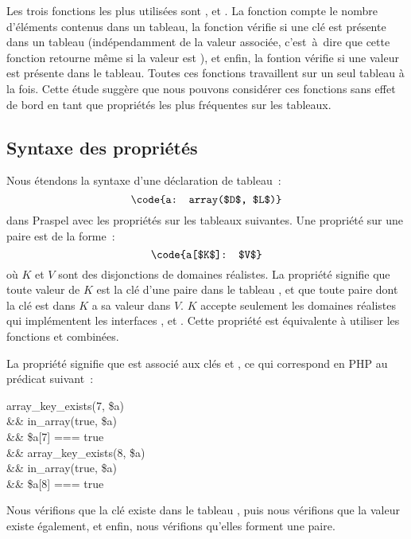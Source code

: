 %
Les trois fonctions les plus utilisées sont ,
 et . La fonction 
compte le nombre d'éléments contenus dans un tableau, la fonction
 vérifie si une clé est présente dans un tableau
(indépendamment de la valeur associée, c'est~à~dire que cette fonction retourne
 même si la valeur est ), et enfin, la fontion
 vérifie si une valeur est présente dans le tableau. Toutes
ces fonctions travaillent sur un seul tableau à la fois. Cette étude suggère que
nous pouvons considérer ces fonctions sans effet de bord en tant que propriétés
les plus fréquentes sur les tableaux.

\subsection{Syntaxe des propriétés}
\label{subsection:data:array_properties}

Nous étendons la syntaxe d'une déclaration de tableau~:
%
$$\code{a: array($D$, $L$)}$$
%
dans Praspel avec les propriétés sur les tableaux suivantes. Une propriété sur
une paire est de la forme~:
%
$$\code{a[$K$]: $V$}$$
%
où $K$ et $V$ sont des disjonctions de domaines réalistes. La propriété signifie
que toute valeur de $K$ est la clé d'une paire dans le tableau , et que
toute paire dont la clé est dans $K$ a sa valeur dans $V$. $K$ accepte
seulement les domaines réalistes qui implémentent les interfaces
,  et . Cette propriété est
équivalente à utiliser les fonctions  et
 combinées.

\begin{example}

La propriété  signifie que  est associé aux clés
 et , ce qui correspond en PHP au prédicat suivant~:
%
\begin{pre}
   array\_key\_exists(7, \$a) \\
\&\& in\_array(true, \$a) \\
\&\& \$a[7] === true \\
\&\& array\_key\_exists(8, \$a) \\
\&\& in\_array(true, \$a) \\
\&\& \$a[8] === true
\end{pre}
%
Nous vérifions que la clé  existe dans le tableau , puis nous
vérifions que la valeur  existe également, et enfin, nous vérifions
qu'elles forment une paire.

\end{example}

